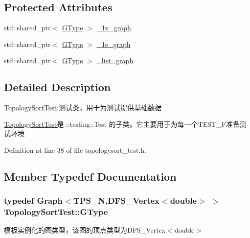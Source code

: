 \subsection*{Protected Attributes}
\begin{DoxyCompactItemize}
\item 
std\+::shared\+\_\+ptr$<$ \hyperlink{class_topology_sort_test_aa530f6f774d1b97dbb3968d9e445ce21}{G\+Type} $>$ \hyperlink{class_topology_sort_test_a087401853f564307534465e2ac59c0ef}{\+\_\+1v\+\_\+graph}
\item 
std\+::shared\+\_\+ptr$<$ \hyperlink{class_topology_sort_test_aa530f6f774d1b97dbb3968d9e445ce21}{G\+Type} $>$ \hyperlink{class_topology_sort_test_af1fe553500cfb175b236a0302d9044af}{\+\_\+1e\+\_\+graph}
\item 
std\+::shared\+\_\+ptr$<$ \hyperlink{class_topology_sort_test_aa530f6f774d1b97dbb3968d9e445ce21}{G\+Type} $>$ \hyperlink{class_topology_sort_test_ac664dd33d2aa257a993c1835caa0d5ad}{\+\_\+list\+\_\+graph}
\end{DoxyCompactItemize}


\subsection{Detailed Description}
\hyperlink{class_topology_sort_test}{Topology\+Sort\+Test}\+:测试类，用于为测试提供基础数据 

{\ttfamily \hyperlink{class_topology_sort_test}{Topology\+Sort\+Test}}是 {\ttfamily \+::testing\+::\+Test} 的子类。它主要用于为每一个{\ttfamily T\+E\+S\+T\+\_\+\+F}准备测试环境 

Definition at line 38 of file topologysort\+\_\+test.\+h.



\subsection{Member Typedef Documentation}
\hypertarget{class_topology_sort_test_aa530f6f774d1b97dbb3968d9e445ce21}{}
\subsubsection[{G\+Type}]{\setlength{\rightskip}{0pt plus 5cm}typedef {\bf Graph}$<$T\+P\+S\+\_\+\+N,{\bf D\+F\+S\+\_\+\+Vertex}$<$double$>$ $>$ {\bf Topology\+Sort\+Test\+::\+G\+Type}}\label{class_topology_sort_test_aa530f6f774d1b97dbb3968d9e445ce21}
模板实例化的图类型，该图的顶点类型为{\ttfamily D\+F\+S\+\_\+\+Vertex$<$double$>$} 

